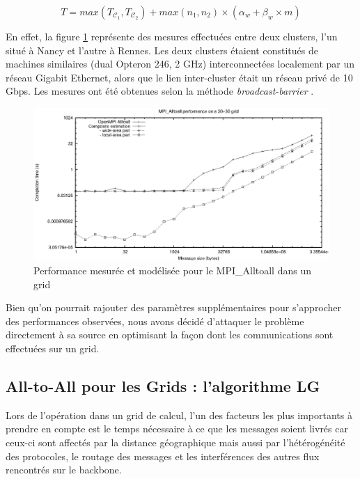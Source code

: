 \begin{equation}
T=max(T_{\mathcal C_1},T_{\mathcal C_2})+max(n_1, n_2) \times (\alpha_w+\beta_w \times m)
\label{eq:7}\end{equation}

En effet, la figure \ref{Figure: standard} représente des mesures effectuées entre deux clusters, l'un situé à Nancy et l'autre à Rennes. Les deux clusters étaient constitués de machines similaires (dual Opteron 246, 2 GHz) interconnectées localement par un réseau Gigabit Ethernet, alors que le lien inter-cluster était un réseau privé de 10 Gbps. Les mesures ont été obtenues selon la méthode \emph{broadcast-barrier} \cite{Supinski99}.


\begin{figure}
	\centering
	\includegraphics[width=0.7\columnwidth]{images/standard}
	\caption{\label{Figure: standard}Performance mesurée et modélisée pour le MPI\_Alltoall dans un grid} %
\end{figure}
 
Bien qu'on pourrait rajouter des paramètres supplémentaires pour s'approcher des performances observées, nous avons décidé d'attaquer le problème directement à sa source en optimisant la façon dont les communications sont effectuées sur un grid. 


\subsection{All-to-All pour les Grids : l'algorithme LG}

Lors de l'opération dans un grid de calcul, l'un des facteurs les plus importants à prendre en compte est le temps nécessaire à ce que les messages soient livrés car ceux-ci sont affectés par la distance géographique mais aussi par l'hétérogénéité des protocoles, le routage des messages et les interférences des autres flux rencontrés sur le backbone. 

